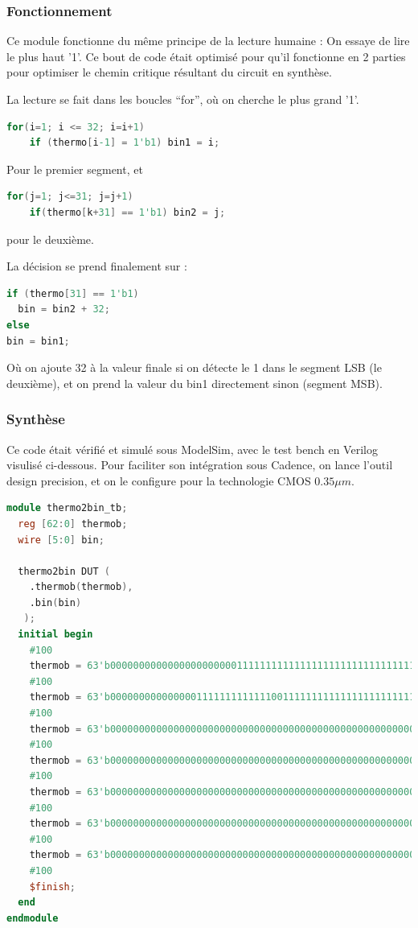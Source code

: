 \documentclass[11pt]{article}
\begin{document}
\subsubsection{Fonctionnement}

Ce module fonctionne du m\^eme principe de la lecture humaine : On essaye de lire le plus
haut '1'. Ce bout de code \'etait optimis\'e pour qu'il fonctionne en 2 parties pour optimiser
le chemin critique r\'esultant du circuit en synth\`ese. 

La lecture se fait dans les boucles ``for'', o\`u on cherche le plus grand '1'.
\begin{lstlisting}[language=Verilog, belowskip=-2 \baselineskip]
 for(i=1; i <= 32; i=i+1)
    if (thermo[i-1] = 1'b1) bin1 = i;
\end{lstlisting}
Pour le premier segment, et
\begin{lstlisting}[language=Verilog, belowskip=-2 \baselineskip]
  for(j=1; j<=31; j=j+1)
    if(thermo[k+31] == 1'b1) bin2 = j;
\end{lstlisting}
pour le deuxi\`eme.

La d\'ecision se prend finalement sur :
\begin{lstlisting}[language=Verilog, belowskip=-2 \baselineskip]
if (thermo[31] == 1'b1)
  bin = bin2 + 32;
else
bin = bin1;
\end{lstlisting}
O\`u on ajoute 32 \`a la valeur finale si on d\'etecte le 1 dans le segment LSB (le deuxi\`eme),
et on prend la valeur du bin1 directement sinon (segment MSB).

\subsubsection{Synth\`ese}

Ce code \'etait v\'erifi\'e et simul\'e sous ModelSim, avec le test bench en Verilog visulis\'e ci-dessous. Pour faciliter son int\'egration sous Cadence, on lance l'outil design precision, et on le configure pour la technologie CMOS $0.35 \mu m$.

\begin{lstlisting}[language=Verilog, belowskip=-2 \baselineskip]
module thermo2bin_tb;
  reg [62:0] thermob;
  wire [5:0] bin;
	
  thermo2bin DUT (
    .thermob(thermob),
    .bin(bin)
   );
  initial begin
    #100
    thermob = 63'b000000000000000000000011111111111111111111111111111111111111111;
    #100
    thermob = 63'b000000000000000111111111111100111111111111111111111111111111111;
    #100
    thermob = 63'b000000000000000000000000000000000000000000000000000000000000000;
    #100
    thermob = 63'b000000000000000000000000000000000000000000000000000000000000001;
    #100
    thermob = 63'b000000000000000000000000000000000000000000000000000000000000100;	
    #100
    thermob = 63'b000000000000000000000000000000000000000000000000000000000000110;
    #100
    thermob = 63'b000000000000000000000000000000000000000000000000000000000000111;
    #100
    $finish;
  end
endmodule
\end{lstlisting}
\end{document}
